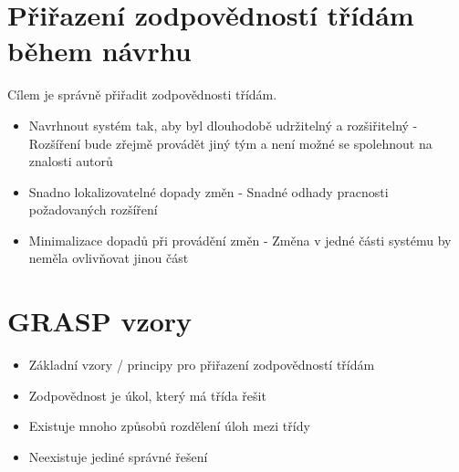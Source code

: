 \documentclass{szzclass}
\begin{document}
\section{Přiřazení zodpovědností třídám během návrhu}
Cílem je správně přiřadit zodpovědnosti třídám.
\begin{itemize}
\item Navrhnout systém tak, aby byl dlouhodobě udržitelný a rozšiřitelný - Rozšíření bude zřejmě provádět jiný tým a není možné se spolehnout na znalosti autorů
\item Snadno lokalizovatelné dopady změn - Snadné odhady pracnosti požadovaných rozšíření
\item Minimalizace dopadů při provádění změn - Změna v jedné části systému by neměla ovlivňovat jinou část
\end{itemize}

\section{GRASP vzory}
\begin{itemize}
\item Základní vzory / principy pro přiřazení zodpovědností třídám
\item Zodpovědnost je úkol, který má třída řešit
\item Existuje mnoho způsobů rozdělení úloh mezi třídy
\item Neexistuje jediné správné řešení
\end{itemize}
\end{document}

